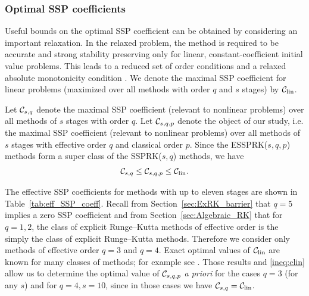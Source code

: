 \subsubsection{Optimal SSP coefficients}\label{subsubsec:optimal_SSP_coeff}
Useful bounds on the optimal SSP coefficient can be obtained 
by considering an important relaxation. 
In the relaxed problem, the method is required to be accurate and strong 
stability preserving only for linear, constant-coefficient initial value problems. 
This leads to a reduced set of order conditions and a relaxed absolute 
monotonicity condition \cite{Kraaijevanger1986,Ketcheson2008,ketcheson2009a}.
We denote the maximal SSP coefficient for linear problems
(maximized over all methods with order $q$ and $s$ stages) by $\mathcal{C}_{\text{lin}}$.

Let $\mathcal{C}_{s,q}$ denote the maximal SSP coefficient (relevant to
nonlinear problems) over all methods of $s$ stages with order $q$.  Let
$\mathcal{C}_{s,q,p}$ denote the object of our study, i.e. the maximal SSP
coefficient (relevant to nonlinear problems) over all methods of $s$ stages
with effective order $q$ and classical order $p$.
Since the ESSPRK($s,q,p$) methods form a super class of the SSPRK($s,q$)
methods, we have
\begin{align} \label{ineq:clin}
        \mathcal{C}_{s,q} \le \mathcal{C}_{s,q,p} \le\mathcal{C}_{\text{lin}}.
\end{align}

The effective SSP coefficients for methods with up to eleven stages are shown in 
Table~\ref{tab:eff_SSP_coeff}.
Recall from Section~\ref{sec:ExRK_barrier} that $q=5$ implies a zero
SSP coefficient and from Section~\ref{sec:Algebraic_RK} that for
$q=1,2$, the class of explicit Runge--Kutta methods of effective order
is the simply the class of explicit Runge--Kutta methods.  %
Therefore we consider only methods of effective order $q=3$ and $q=4$.
Exact optimal values of $\mathcal{C}_{\text{lin}}$ are known for many classes of methods; for
example see \cite{Kraaijevanger1986,Ketcheson2008,ketcheson2009a}.
Those results and \eqref{ineq:clin} allow us to determine the optimal value
of $\mathcal{C}_{s,q,p}$ {\em a priori} for the cases $q=3$ (for any $s$) and
for $q=4,s=10$, since in those cases we have $\mathcal{C}_{s,q}=\mathcal{C}_{\text{lin}}$.


